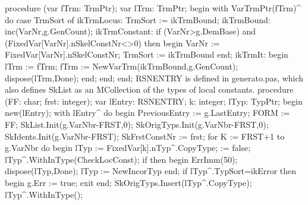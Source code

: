 \nwenddocs{}\endmoddef\nwstartdeflinemarkup{}\nwenddeflinemarkup
procedure (var fTrm: TrmPtr);
var
   lTrm: TrmPtr;
begin
   with VarTrmPtr(fTrm)^ do
      case TrmSort of
         ikTrmLocus: TrmSort := ikTrmBound;
         ikTrmBound: inc(VarNr,g.GenCount);
         ikTrmConstant:
            if (VarNr>g.DemBase) and (FixedVar[VarNr].nSkelConstNr<>0) then
            begin VarNr := FixedVar[VarNr].nSkelConstNr; TrmSort := ikTrmBound end;
         ikTrmIt:
            begin lTrm := fTrm; fTrm := NewVarTrm(ikTrmBound,g.GenCount);
            dispose(lTrm,Done);
            end;
      end;
end;
\eatline
{}\nwendcode{}\nwdocspar
{\Tt{}RSNENTRY\nwendquote} is defined in generato.pas, which also defines {\Tt{}SkList\nwendquote}
as an {\Tt{}MCollection\nwendquote} of the types of local constants.
\nwenddocs{}\endmoddef\nwstartdeflinemarkup{}\nwenddeflinemarkup
procedure (FF: char; frst: integer);
var
   lEntry: RSNENTRY;
   k: integer;
   lTyp: TypPtr;
begin
   new(lEntry);
   with lEntry^ do
   begin
      PreviousEntry := g.LastEntry;
      FORM := FF;
      SkList.Init(g.VarNbr-FRST,0);
      SkOrigTyps.Init(g.VarNbr-FRST,0);
      SkIdents.Init(g.VarNbr-FRST);
      SkFrstConstNr := frst;
      for K := FRST+1 to g.VarNbr do
      begin
         lTyp := FixedVar[k].nTyp^.CopyType;
          := false;
         lTyp^.WithInType(CheckLocConst);
         if  then
         begin ErrImm(50); dispose(lTyp,Done); lTyp := NewIncorTyp end;
         if lTyp^.TypSort=ikError then begin g.Err := true; exit end;
         SkOrigTyps.Insert(lTyp^.CopyType);
         lTyp^.WithInType();
